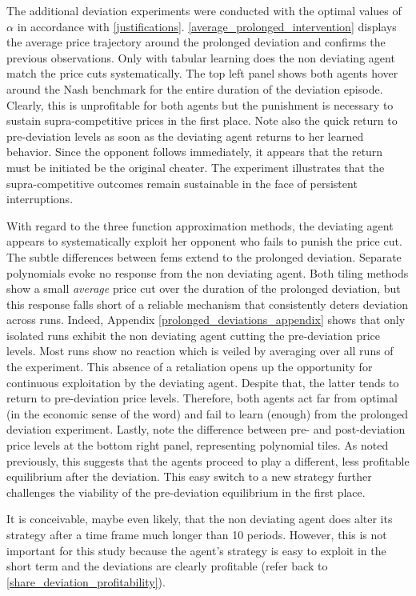 The additional deviation experiments were conducted with the optimal values of $\alpha$ in accordance with \autoref{justifications}. \autoref{average_prolonged_intervention} displays the average price trajectory around the prolonged deviation and confirms the previous observations. Only with tabular learning does the non deviating agent match the price cuts systematically. The top left panel shows both agents hover around the Nash benchmark for the entire duration of the deviation episode. Clearly, this is unprofitable for both agents but the punishment is necessary to sustain supra-competitive prices in the first place. Note also the quick return to pre-deviation levels as soon as the deviating agent returns to her learned behavior. Since the opponent follows immediately, it appears that the return must be initiated be the original cheater. The experiment illustrates that the supra-competitive outcomes remain sustainable in the face of persistent interruptions.

With regard to the three function approximation methods, the deviating agent appears to systematically exploit her opponent who fails to punish the price cut. The subtle differences between \gls{fem}s extend to the prolonged deviation. Separate polynomials evoke no response from the non deviating agent. Both tiling methods show a small \emph{average} price cut over the duration of the prolonged deviation, but this response falls short of a reliable mechanism that consistently deters deviation across runs. Indeed, Appendix \ref{prolonged_deviations_appendix} shows that only isolated runs exhibit the non deviating agent cutting the pre-deviation price levels. Most runs show no reaction which is veiled by averaging over all runs of the experiment. This absence of a retaliation opens up the opportunity for continuous exploitation by the deviating agent. Despite that, the latter tends to return to pre-deviation price levels. Therefore, both agents act far from optimal (in the economic sense of the word) and fail to learn (enough) from the prolonged deviation experiment. Lastly, note the difference between pre- and post-deviation price levels at the bottom right panel, representing polynomial tiles. As noted previously, this suggests that the agents proceed to play a different, less profitable equilibrium after the deviation. This easy switch to a new strategy further challenges the viability of the pre-deviation equilibrium in the first place.

It is conceivable, maybe even likely, that the non deviating agent does alter its strategy after a time frame much longer than 10 periods. However, this is not important for this study because the agent's strategy is easy to exploit in the short term and the deviations are clearly profitable (refer back to \autoref{share_deviation_profitability}).


